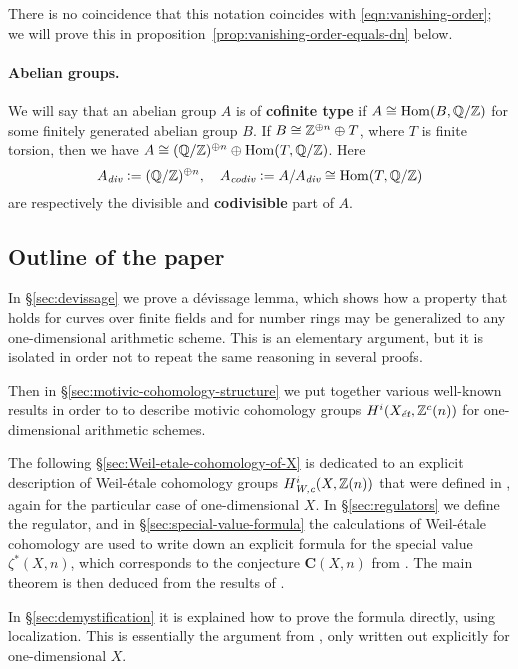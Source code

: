 \documentclass{article}
\numberwithin{equation}{section}
\begin{document}
There is no coincidence that this notation coincides with
\eqref{eqn:vanishing-order}; we will prove this
in proposition~\ref{prop:vanishing-order-equals-dn} below.

\paragraph{Abelian groups.}
We will say that an abelian group $A$ is of \textbf{cofinite type} if
$A \cong \Hom (B, \QQ/\ZZ)$ for some finitely generated abelian group $B$.  If
$B \cong \ZZ^{\oplus n} \oplus T$, where $T$ is finite torsion, then we have
$A \cong (\QQ/\ZZ)^{\oplus n} \oplus \Hom (T, \QQ/\ZZ)$. Here
\[ A_\div \dfn (\QQ/\ZZ)^{\oplus n}, \quad
  A_\codiv \dfn A/A_\div \cong \Hom (T, \QQ/\ZZ) \]
are respectively the divisible and \textbf{codivisible} part of $A$.

\subsection*{Outline of the paper}

In \S\ref{sec:devissage} we prove a dévissage lemma, which shows how a property
that holds for curves over finite fields and for number rings may be generalized
to any one-dimensional arithmetic scheme. This is an elementary argument, but it
is isolated in order not to repeat the same reasoning in several proofs.

Then in \S\ref{sec:motivic-cohomology-structure} we put together various
well-known results in order to to describe motivic cohomology groups
$H^i (X_\et, \ZZ^c(n))$ for one-dimensional arithmetic schemes.

The following \S\ref{sec:Weil-etale-cohomology-of-X} is dedicated to an explicit
description of Weil-étale cohomology groups $H^i_\Wc (X, \ZZ(n))$ that were
defined in \cite{Beshenov-Weil-etale-1}, again for the particular case of
one-dimensional $X$. In \S\ref{sec:regulators} we define the regulator, and in
\S\ref{sec:special-value-formula} the calculations of Weil-étale cohomology are
used to write down an explicit formula for the special value $\zeta^* (X,n)$,
which corresponds to the conjecture $\mathbf{C} (X,n)$ from
\cite{Beshenov-Weil-etale-2}. The main theorem is then deduced from the results
of \cite{Beshenov-Weil-etale-2}.

In \S\ref{sec:demystification} it is explained how to prove the formula
directly, using localization. This is essentially the argument from
\cite{Beshenov-Weil-etale-2}, only written out explicitly for one-dimensional
$X$.
\end{document}
